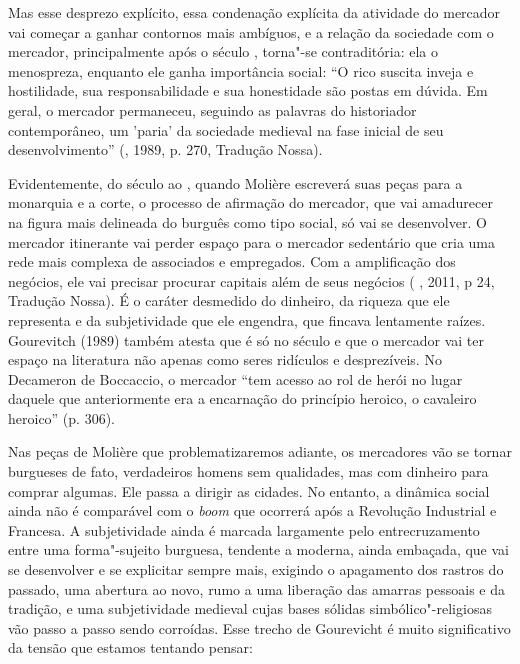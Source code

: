 Mas esse desprezo explícito, essa condenação explícita da atividade do
mercador vai começar a ganhar contornos mais ambíguos, e a relação da
sociedade com o mercador, principalmente após o século , torna"-se
contraditória: ela o menospreza, enquanto ele ganha importância social:
``O rico suscita inveja e hostilidade, sua responsabilidade e sua
honestidade são postas em dúvida. Em geral, o mercador permaneceu,
seguindo as palavras do historiador contemporâneo, um 'paria' da
sociedade medieval na fase inicial de seu desenvolvimento'' (,
1989, p. 270, Tradução Nossa).

Evidentemente, do século  ao , quando Molière escreverá suas
peças para a monarquia e a corte, o processo de afirmação do mercador,
que vai amadurecer na figura mais delineada do burguês como tipo social,
só vai se desenvolver. O mercador itinerante vai perder espaço para o
mercador sedentário que cria uma rede mais complexa de associados e
empregados. Com a amplificação dos negócios, ele vai precisar procurar
capitais além de seus negócios ( , 2011, p 24, Tradução Nossa). É
o caráter desmedido do dinheiro, da riqueza que ele representa e da
subjetividade que ele engendra, que fincava lentamente raízes.
Gourevitch (1989) também atesta que é só no século  e  que o
mercador vai ter espaço na literatura não apenas como seres ridículos e
desprezíveis. No Decameron de Boccaccio, o mercador ``tem acesso ao rol
de herói no lugar daquele que anteriormente era a encarnação do
princípio heroico, o cavaleiro heroico'' (p. 306).

Nas peças de Molière que problematizaremos adiante, os mercadores vão se
tornar burgueses de fato, verdadeiros homens sem qualidades, mas com
dinheiro para comprar algumas. Ele passa a dirigir as cidades. No
entanto, a dinâmica social ainda não é comparável com o \emph{boom} que
ocorrerá após a Revolução Industrial e Francesa. A subjetividade ainda é
marcada largamente pelo entrecruzamento entre uma forma"-sujeito
burguesa, tendente a moderna, ainda embaçada, que vai se desenvolver e
se explicitar sempre mais, exigindo o apagamento dos rastros do passado,
uma abertura ao novo, rumo a uma liberação das amarras pessoais e da
tradição, e uma subjetividade medieval cujas bases sólidas
simbólico"-religiosas vão passo a passo sendo corroídas. Esse trecho de
Gourevicht é muito significativo da tensão que estamos tentando pensar:

